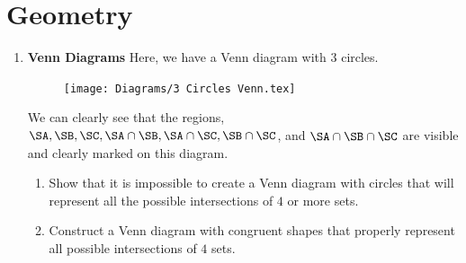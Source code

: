 \documentclass[11pt]{scrartcl}
\begin{document}
\newpage
\section{Geometry}
\begin{enumerate}[label=\textbf{G\arabic*}.]
    \item \textbf{Venn Diagrams} \newline
    Here, we have a Venn diagram with $3$ circles.
    \begin{figure}[h]
        \centering
        \texttt{[image: Diagrams/3 Circles Venn.tex]}
        \label{fig:3-Circles-Venn}
    \end{figure}
    
    We can clearly see that the regions, $\SA, \SB, \SC, \SA \cap \SB, \SA \cap \SC, \SB \cap \SC$, and $\SA \cap \SB \cap \SC$ are visible and clearly marked on this diagram.
    
    \begin{enumerate}
        \item Show that it is impossible to create a Venn diagram with circles that will represent all the possible intersections of $4$ or more sets.
        
        \item Construct a Venn diagram with congruent shapes that properly represent all possible intersections of $4$ sets.
    \end{enumerate}
\end{enumerate}

\newpage
\end{document}
